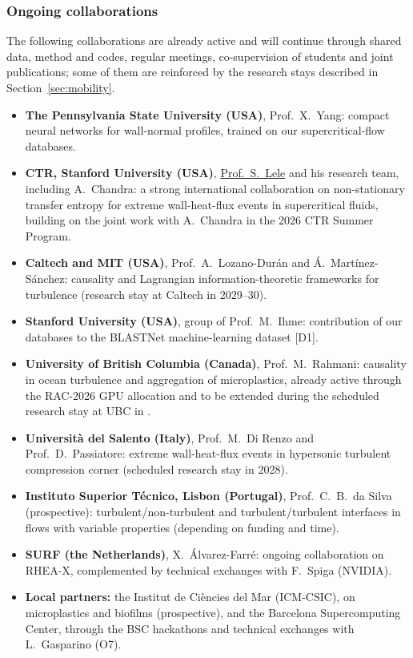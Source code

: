 \documentclass[11pt]{article}
\newcommand{\NEW}[1]{\iffinal #1\else{\color{red}#1}\fi}
\begin{document}
\subsubsection{Ongoing collaborations}
The following collaborations are already active and will continue through shared data, method and codes, regular meetings, co-supervision of students and joint publications; some of them are reinforced by the research stays described in Section~\ref{sec:mobility}.
\begin{itemize}
  \item \textbf{The Pennsylvania State University (USA)}, Prof.\ X.\ Yang: compact neural networks
  for wall-normal profiles, trained on our supercritical-flow databases.
  \item \textbf{CTR, Stanford University (USA)},
  \href{https://me.stanford.edu/people/sanjiva-lele}{Prof.\ S.\ Lele} and his research team, including   A.\ Chandra: a strong international collaboration on non-stationary transfer entropy for extreme wall-heat-flux events in supercritical fluids, building on the joint work with A.\ Chandra in the 2026 CTR Summer Program.
  \item \textbf{Caltech and MIT (USA)}, Prof.\ A.\ Lozano-Dur\'an and \'A.\ Mart\'inez-S\'anchez:   causality and Lagrangian information-theoretic frameworks for turbulence (research stay at Caltech in 2029--30).
  \item \textbf{Stanford University (USA)}, group of Prof.\ M.\ Ihme: contribution of our databases to the BLASTNet machine-learning dataset [D1].
  \item \textbf{University of British Columbia (Canada)}, Prof.\ M.\ Rahmani: causality in ocean turbulence and aggregation of microplastics, already active through the RAC-2026 GPU allocation and to be extended during the \NEW{scheduled} research stay at UBC in \NEW{2027.}
  \item \textbf{Universit\`a del Salento (Italy)}, Prof.\ M.\ Di Renzo and Prof.\ D.\ Passiatore:
  extreme wall-heat-flux events in hypersonic turbulent compression corner (scheduled research stay in 2028).
  \item \textbf{Instituto Superior T\'ecnico, Lisbon (Portugal)}, Prof.\ C.\ B.\ da Silva
  (prospective): turbulent/non-turbulent and turbulent/turbulent interfaces in flows with
  variable properties (depending on funding and time).
  \item \textbf{SURF (the Netherlands)}, X.\ \'Alvarez-Farr\'e: ongoing collaboration on RHEA-X,
  complemented by technical exchanges with F.\ Spiga (NVIDIA).
  \item \textbf{Local partners:} the Institut de Ci\`encies del Mar (ICM-CSIC), on microplastics and biofilms (prospective), and the Barcelona Supercomputing Center, through the BSC hackathons and technical exchanges with L.\ Gasparino (O7).
\end{itemize}
\end{document}
